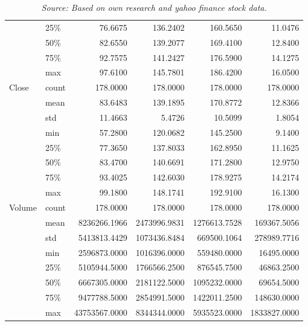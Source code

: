 \documentclass[11pt]{article} %
\begin{document}
\begin{table}[hbt!]
\begin{tabular}{llrrrr}
       & 25\% &       76.6675 &     136.2402 &     160.5650 &      11.0476 \\
       & 50\% &       82.6550 &     139.2077 &     169.4100 &      12.8400 \\
       & 75\% &       92.7575 &     141.2427 &     176.5900 &      14.1275 \\
       & max &       97.6100 &     145.7801 &     186.4200 &      16.0500 \\
Close & count &      178.0000 &     178.0000 &     178.0000 &     178.0000 \\
       & mean &       83.6483 &     139.1895 &     170.8772 &      12.8366 \\
       & std &       11.4663 &       5.4726 &      10.5099 &       1.8054 \\
       & min &       57.2800 &     120.0682 &     145.2500 &       9.1400 \\
       & 25\% &       77.3650 &     137.8033 &     162.8950 &      11.1625 \\
       & 50\% &       83.4700 &     140.6691 &     171.2800 &      12.9750 \\
       & 75\% &       93.4025 &     142.6030 &     178.9275 &      14.2174 \\
       & max &       99.1800 &     148.1741 &     192.9100 &      16.1300 \\
Volume & count &      178.0000 &     178.0000 &     178.0000 &     178.0000 \\
       & mean &  8236266.1966 & 2473996.9831 & 1276613.7528 &  169367.5056 \\
       & std &  5413813.4429 & 1073436.8484 &  669500.1064 &  278989.7716 \\
       & min &  2596873.0000 & 1016396.0000 &  559480.0000 &   16495.0000 \\
       & 25\% &  5105944.5000 & 1766566.2500 &  876545.7500 &   46863.2500 \\
       & 50\% &  6667305.0000 & 2181122.5000 & 1095232.0000 &   69654.5000 \\
       & 75\% &  9477788.5000 & 2854991.5000 & 1422011.2500 &  148630.0000 \\
       & max & 43753567.0000 & 8344344.0000 & 5935523.0000 & 1833827.0000 \\
\bottomrule
\end{tabular}
\caption*{\textit{Source: Based on own research and yahoo finance stock data.}}
\end{table}

\clearpage
\end{document}
